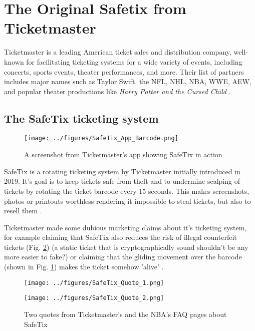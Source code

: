 \section{The Original Safetix from Ticketmaster}
Ticketmaster is a leading American ticket sales and distribution company, well-known for facilitating ticketing systems for a wide variety of events, 
including concerts, sports events, theater performances, and more. Their list of partners includes major names such as Taylor Swift, 
the NFL, NHL, NBA, WWE, AEW, and popular theater productions like \textit{Harry Potter and the Cursed Child} \cite{ticketmaster_wikipedia}. 

\subsection{The SafeTix ticketing system}
\begin{figure}[H]
    \begin{center}        
    \texttt{[image: ../figures/SafeTix\_App\_Barcode.png]}
    \caption{A screenshot from Ticketmaster's app showing SafeTix in action \cite{ticketmaster_mobile_ticketing}}
    \label{fig:app_barcode}
    \end{center}
\end{figure}

SafeTix is a rotating ticketing system by Ticketmaster initially introduced in 2019. It's goal is to keep tickets safe from theft and to undermine scalping of tickets by rotating the ticket barcode every 15 seconds. This makes screenshots, photos or printouts worthless rendering it impossible to steal tickets, but also to resell them \cite{introducing_safetix} \cite{ticketmaster_safetix_faq} \cite{nba_safetix_faq}. 

Ticketmaster made some dubious marketing claims about it's ticketing system, for example claiming that SafeTix also reduces the risk of illegal counterfeit tickets (Fig. \ref{fig:safetix_quotes}) (a static ticket that is cryptographically sound shouldn't be any more easier to fake?) or claiming that the gliding movement over the barcode (shown in Fig. \ref{fig:app_barcode}) makes the ticket somehow 'alive' \cite{nba_safetix_faq} \cite{ticketmaster_safetix_faq}.

\begin{figure}[H]
    \begin{center}
        \texttt{[image: ../figures/SafeTix\_Quote\_1.png]}
    \end{center}
    \begin{center}
        \texttt{[image: ../figures/SafeTix\_Quote\_2.png]}
    \end{center}
    \caption{Two quotes from Ticketmaster's and the NBA's FAQ pages about SafeTix \cite{ticketmaster_safetix_faq} \cite{nba_safetix_faq}}
    \label{fig:safetix_quotes}
\end{figure}

